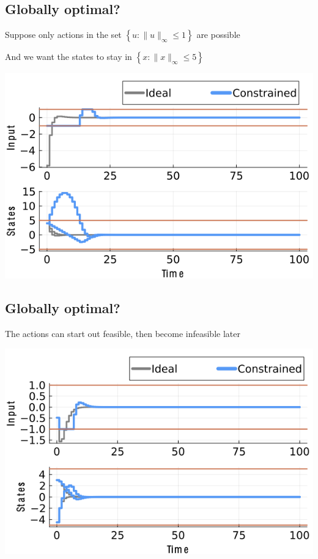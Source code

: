 \documentclass[
  letterpaper,
  DIV=11,
  numbers=noendperiod,
  oneside]{scrartcl}
\begin{document}
\subsection{Globally optimal?}\label{globally-optimal-3}

Suppose only actions in the set
\(\left\{ u \colon \lVert u \rVert_{\infty} \leq 1 \right\}\) are
possible

And we want the states to stay in
\(\left\{ x \colon \lVert x \rVert_{\infty} \leq 5 \right\}\)

\begin{center}
\includegraphics{figs/lqr_constrained.png}
\end{center}

\subsection{Globally optimal?}\label{globally-optimal-4}

The actions can start out feasible, then become infeasible later

\begin{center}
\includegraphics{figs/lqr_constrained_later.png}
\end{center}
\end{document}
